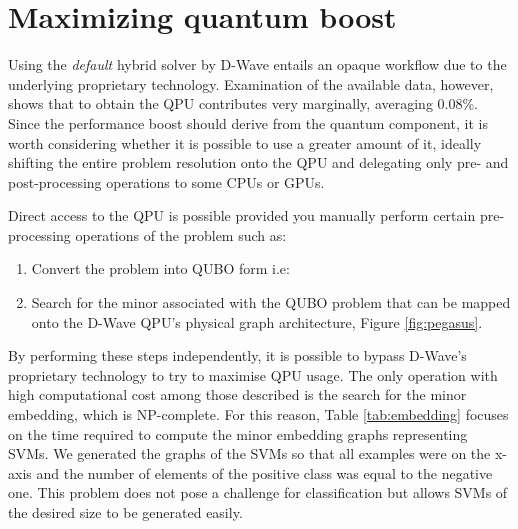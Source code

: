 \documentclass{ceurart}
\begin{document}
\section{Maximizing quantum boost}

Using the \emph{default} hybrid solver by D-Wave entails an opaque workflow due to the underlying proprietary technology. Examination of the available data, however, shows that to obtain the QPU contributes very marginally, averaging 0.08\%. Since the performance boost should derive from the quantum component, it is worth considering whether it is possible to use a greater amount of it, ideally shifting the entire problem resolution onto the QPU and delegating only pre- and post-processing operations to some CPUs or GPUs.

Direct access to the QPU is possible provided you manually perform certain pre-processing operations of the problem such as:
\begin{enumerate}
    \item Convert the problem into QUBO form i.e:
    \item Search for the minor\cite{ME}\cite{MEdwave} associated with the QUBO problem that can be mapped onto the D-Wave QPU's physical graph architecture, Figure \ref{fig:pegasus}.
\end{enumerate}

By performing these steps independently, it is possible to bypass D-Wave's proprietary technology to try to maximise QPU usage. 
The only operation with high computational cost among those described is the search for the minor embedding, which is NP-complete. For this reason, Table \ref{tab:embedding} focuses on the time required to compute the minor embedding graphs representing SVMs. 
We generated the graphs of the SVMs so that all examples were on the x-axis and the number of elements of the positive class was equal to the negative one. This problem does not pose a challenge for classification but allows SVMs of the desired size to be generated easily.
\end{document}
